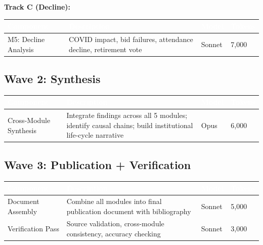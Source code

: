 \documentclass[11pt,letterpaper]{article}
\newcommand{\tableheader}[1]{\textbf{\sffamily\textcolor{white}{#1}}}
\begin{document}
\textbf{Track C (Decline):}

\begin{center}
\begin{tabularx}{\textwidth}{L{3cm}XC{1.5cm}C{1.5cm}}
\toprule
{}
\tableheader{Component} & \tableheader{Description} & \tableheader{Model} & \tableheader{Tokens} \\
\midrule
M5: Decline Analysis & COVID impact, bid failures, attendance decline, retirement vote & Sonnet & 7,000 \\
\bottomrule
\end{tabularx}
\end{center}

\subsection{Wave 2: Synthesis}

\begin{center}
\begin{tabularx}{\textwidth}{L{3cm}XC{1.5cm}C{1.5cm}}
\toprule
{}
\tableheader{Component} & \tableheader{Description} & \tableheader{Model} & \tableheader{Tokens} \\
\midrule
Cross-Module Synthesis & Integrate findings across all 5 modules; identify causal chains; build institutional life-cycle narrative & Opus & 6,000 \\
\bottomrule
\end{tabularx}
\end{center}

\subsection{Wave 3: Publication + Verification}

\begin{center}
\begin{tabularx}{\textwidth}{L{3cm}XC{1.5cm}C{1.5cm}}
\toprule
{}
\tableheader{Component} & \tableheader{Description} & \tableheader{Model} & \tableheader{Tokens} \\
\midrule
Document Assembly & Combine all modules into final publication document with bibliography & Sonnet & 5,000 \\
Verification Pass & Source validation, cross-module consistency, accuracy checking & Sonnet & 3,000 \\
\bottomrule
\end{tabularx}
\end{center}
\end{document}
